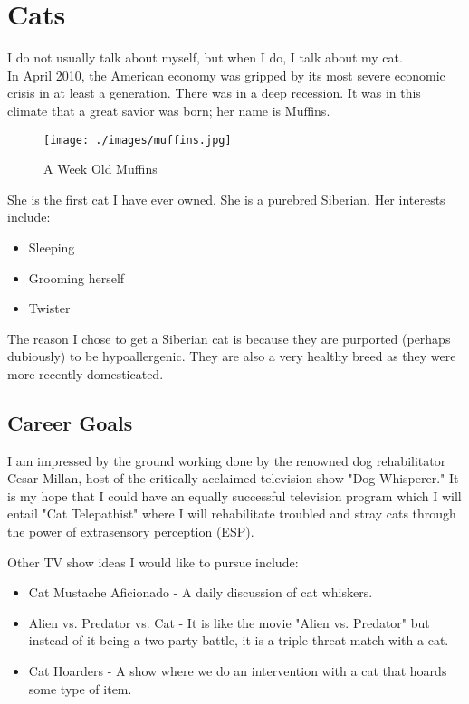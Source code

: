\chapter{Cats}

I do not usually talk about myself, but when I do, I talk about my cat.\\

In April 2010, the American economy was gripped by its most severe economic crisis in at least a generation.  There was in a deep recession.  It was in this climate that a great savior was born; her name is Muffins.  

\begin{figure}[ht!]
\centering
\texttt{[image: ./images/muffins.jpg]}
\caption{A Week Old Muffins}
\end{figure}

She is the first cat I have ever owned.  She is a purebred Siberian.  Her interests include: \\
\begin{itemize}
	\item Sleeping
	\item Grooming herself
	\item Twister
\end{itemize}

The reason I chose to get a Siberian cat is because they are purported (perhaps dubiously) to be hypoallergenic. They are also a very healthy breed as they were more recently domesticated.\

\section{Career Goals}

I am impressed by the ground working done by the renowned dog rehabilitator Cesar Millan, host of the critically acclaimed television show "Dog Whisperer." It is my hope that I could have an equally successful television program which I will entail "Cat Telepathist"  where I will rehabilitate troubled and stray cats through the power of extrasensory perception (ESP).


Other TV show ideas I would like to pursue include:
\begin{itemize}
	\item Cat Mustache Aficionado - A daily discussion of cat whiskers.
	\item Alien vs. Predator vs. Cat - It is like the movie "Alien vs. Predator" but instead of it being a two party battle, it is a triple threat match with a cat.
	\item Cat Hoarders - A show where we do an intervention with a cat that hoards some type of item.
\end{itemize}
